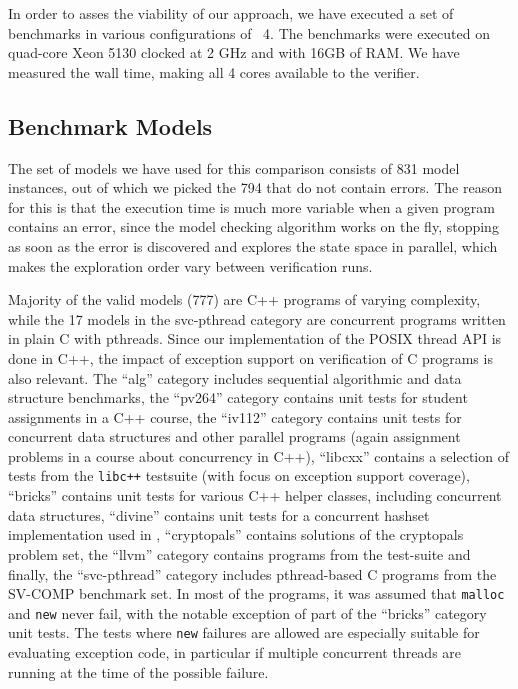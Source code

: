 In order to asses the viability of our approach, we have executed a set
of benchmarks in various configurations of \divine{}~4. The benchmarks were
executed on quad-core Xeon 5130 clocked at 2 GHz and with 16GB of RAM.
We have measured the wall time, making all 4 cores available to the
verifier.

\subsection{Benchmark Models}\label{benchmark-models}

The set of models we have used for this comparison consists of 831 model
instances, out of which we picked the 794 that do not contain errors.
The reason for this is that the execution time is much more variable
when a given program contains an error, since the model checking
algorithm works on the fly, stopping as soon as the error is discovered and
explores the state space in parallel, which makes the exploration order vary
between verification runs.

Majority of the valid models (777) are C++ programs of varying
complexity, while the 17 models in the svc-pthread category are
concurrent programs written in plain C with pthreads. Since our
implementation of the POSIX thread API is done in C++, the impact of
exception support on verification of C programs is also relevant. The
``alg'' category includes sequential algorithmic and data structure
benchmarks, the ``pv264'' category contains unit tests for student
assignments in a C++ course, the ``iv112'' category contains unit tests
for concurrent data structures and other parallel programs (again assignment
problems in a course about concurrency in C++), ``libcxx'' contains a selection
of tests from
the \texttt{libc++} testsuite (with focus on exception support
coverage), ``bricks'' contains unit tests for various C++ helper
classes, including concurrent data structures, ``divine'' contains unit
tests for a concurrent hashset implementation used in \divine{},
``cryptopals'' contains solutions of the cryptopals problem
set, the ``llvm'' category
contains programs from the \llvm{} test-suite
and finally, the ``svc-pthread'' category includes pthread-based C
programs from the SV-COMP benchmark set. In most of the programs, it was
assumed that \texttt{malloc} and \texttt{new} never fail, with the
notable exception of part of the ``bricks'' category unit tests. The
tests where \texttt{new} failures are allowed are especially suitable
for evaluating exception code, in particular if multiple concurrent
threads are running at the time of the possible failure.

